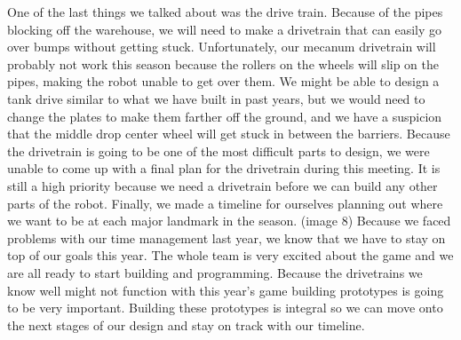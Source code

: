 One of the last things we talked about was the drive train. Because of the pipes blocking off the warehouse, we will need to make a drivetrain that can easily go over bumps without getting stuck. Unfortunately, our mecanum drivetrain will probably not work this season because the rollers on the wheels will slip on the pipes, making the robot unable to get over them. We might be able to design a tank drive similar to what we have built in past years, but we would need to change the plates to make them farther off the ground, and we have a suspicion that the middle drop center wheel will get stuck in between the barriers. Because the drivetrain is going to be one of the most difficult parts to design, we were unable to come up with a final plan for the drivetrain during this meeting. It is still a high priority because we need a drivetrain before we can build any other parts of the robot.
Finally, we made a timeline for ourselves planning out where we want to be at each major landmark in the season. (image 8) Because we faced problems with our time management last year, we know that we have to stay on top of our goals this year.
The whole team is very excited about the game and we are all ready to start building and programming. Because the drivetrains we know well might not function with this year’s game building prototypes is going to be very important. Building these prototypes is integral so we can move onto the next stages of our design and stay on track with our timeline.





